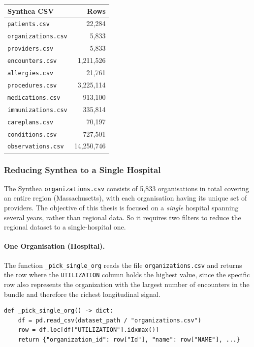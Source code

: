 \begin{center}
\begin{tabular}{lr}
\hline
\textbf{Synthea CSV} & \textbf{Rows} \\
\hline
\texttt{patients.csv}        &        22,284 \\
\texttt{organizations.csv}   &         5,833 \\
\texttt{providers.csv}       &         5,833 \\
\texttt{encounters.csv}      &     1,211,526 \\
\texttt{allergies.csv}       &        21,761 \\
\texttt{procedures.csv}      &     3,225,114 \\
\texttt{medications.csv}     &       913,100 \\
\texttt{immunizations.csv}   &       335,814 \\
\texttt{careplans.csv}       &        70,197 \\
\texttt{conditions.csv}      &       727,501 \\
\texttt{observations.csv}    &    14,250,746 \\
\hline
\end{tabular}
\end{center}

\subsubsection*{Reducing Synthea to a Single Hospital}

The Synthea \texttt{organizations.csv} consists of 5,833 organisations in total covering an entire region (Massachusetts), with each organisation having its unique set of providers. The objective of this thesis is focused on a \emph{single} hospital spanning several years, rather than regional data. So it requires two filters to reduce the regional dataset to a single-hospital one.

\paragraph{One Organisation (Hospital).} The function \texttt{\_pick\_single\_org} reads the file \texttt{organizations.csv} and returns the row where the \texttt{UTILIZATION} column holds the highest value, since the specific row also represents the organization with the largest number of encounters in the bundle and therefore the richest longitudinal signal.

\begin{lstlisting}[style=pythonstyle]
def _pick_single_org() -> dict:
    df = pd.read_csv(dataset_path / "organizations.csv")
    row = df.loc[df["UTILIZATION"].idxmax()]
    return {"organization_id": row["Id"], "name": row["NAME"], ...}
\end{lstlisting}

